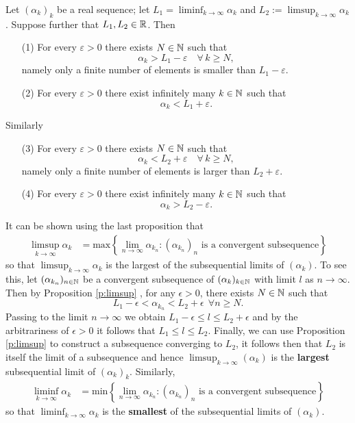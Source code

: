\begin{proposition}
\begin{proposition}
Let $(\alpha_k)_k$ be a real sequence; let $L_1= \liminf_{k\to \infty} \alpha_k$ and $L_2:= \limsup_{k\to \infty} \alpha_k$. Suppose further that $L_1,L_2\in \mathbb{R}$. Then
\begin{itemize}
\item[(1)] For every $\varepsilon>0$ there exists $N\in \mathbb{N}$ such that 
$$
\alpha_k  > L_1 - \varepsilon \quad \forall\, k\geq N,
$$
namely only a finite number of elements is smaller than $L_1 - \varepsilon$.
\item[(2)] For every $\varepsilon>0$ there exist infinitely many $k\in \mathbb{N}$ such that 
$$
\alpha_k < L_1+\varepsilon.
$$
\end{itemize}
Similarly
\begin{itemize}
\item[(3)] For every $\varepsilon>0$ there exists $N\in \mathbb{N}$ such that 
$$
\alpha_k  < L_2+\varepsilon \quad \forall\, k\geq N,
$$
namely only a finite number of elements is larger than $L_2 + \varepsilon$.
\item[(4)] For every $\varepsilon>0$ there exist infinitely many $k\in \mathbb{N}$ such that 
$$
\alpha_k > L_2-\varepsilon.
$$
\end{itemize}
\end{proposition}
\bigskip
\begin{remark}It can be shown using the last proposition that 
	\begin{align*}
	\limsup_{k\to \infty} \alpha_k&=\mathrm{max}\left\{\lim_{n\to \infty} \alpha_{k_n}: (\alpha_{k_n})_n \,\, \text{is a convergent subsequence} \right\}
	\end{align*}
	so that $\limsup_{k\to \infty} \alpha_k$ is the largest of the subsequential limits of $(\alpha_k)$.
	To see this, let $(\alpha_{k_n})_{n\in\mathbb{N}}$ be a convergent subsequence of $(\alpha_k)_{k\in \mathbb{N}}$ with limit $l$ as $n\rightarrow\infty$.
	Then by Proposition \ref{p:limsup} , for any $\epsilon >0$, there exists $N\in\mathbb{N}$ such that 
	$$
	L_1 -\epsilon  < \alpha_{k_n} < L_2+\epsilon \ \ \forall n\geq N.
	$$
	Passing to the limit $n\rightarrow \infty$ we obtain $L_1-\epsilon \leq l \leq L_2+\epsilon$ and by the arbitrariness of $\epsilon >0$ it follows that $L_1\leq l\leq L_2$.
	 Finally, we can use Proposition \ref{p:limsup} to construct a subsequence converging to $L_2$, it follows then that $L_2$ is itself the limit of a subsequence and hence  $\limsup_{k\rightarrow\infty}(\alpha_k)$ is  the \textbf{largest} subsequential limit of $(\alpha_k)_k$. Similarly,  
	\begin{align*}
	\liminf_{k\to \infty} \alpha_k&= \mathrm{min}\left\{\lim_{n\to \infty} \alpha_{k_n}: (\alpha_{k_n})_n \,\, \text{is a convergent subsequence} \right\}
	\end{align*}
	so that $\liminf_{k\to \infty} \alpha_k$ is the \textbf{smallest} of the subsequential limits of $(\alpha_k)$. 
\end{remark}
\newpage


\end{proposition}


